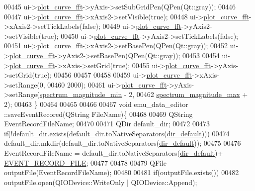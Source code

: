 \begin{DoxyCode}
00445   ui->\hyperlink{a00026_a2bdf46ca3b702151408e6f6bd96b3228}{plot\_curve\_fft}->yAxis->setSubGridPen(QPen(Qt::gray));
00446 
00447   ui->\hyperlink{a00026_a2bdf46ca3b702151408e6f6bd96b3228}{plot\_curve\_fft}->xAxis2->setVisible(\textcolor{keyword}{true});
00448   ui->\hyperlink{a00026_a2bdf46ca3b702151408e6f6bd96b3228}{plot\_curve\_fft}->xAxis2->setTickLabels(\textcolor{keyword}{false});
00449   ui->\hyperlink{a00026_a2bdf46ca3b702151408e6f6bd96b3228}{plot\_curve\_fft}->yAxis2->setVisible(\textcolor{keyword}{true});
00450   ui->\hyperlink{a00026_a2bdf46ca3b702151408e6f6bd96b3228}{plot\_curve\_fft}->yAxis2->setTickLabels(\textcolor{keyword}{false});
00451   ui->\hyperlink{a00026_a2bdf46ca3b702151408e6f6bd96b3228}{plot\_curve\_fft}->xAxis2->setBasePen(QPen(Qt::gray));
00452   ui->\hyperlink{a00026_a2bdf46ca3b702151408e6f6bd96b3228}{plot\_curve\_fft}->yAxis2->setBasePen(QPen(Qt::gray));
00453 
00454    ui->\hyperlink{a00026_a2bdf46ca3b702151408e6f6bd96b3228}{plot\_curve\_fft}->xAxis->setGrid(\textcolor{keyword}{true});
00455    ui->\hyperlink{a00026_a2bdf46ca3b702151408e6f6bd96b3228}{plot\_curve\_fft}->yAxis->setGrid(\textcolor{keyword}{true});
00456 
00457 
00458 
00459   ui->\hyperlink{a00026_a2bdf46ca3b702151408e6f6bd96b3228}{plot\_curve\_fft}->xAxis->setRange(0,
00460                                        2000);
00461   ui->\hyperlink{a00026_a2bdf46ca3b702151408e6f6bd96b3228}{plot\_curve\_fft}->yAxis->setRange(\hyperlink{a00004_afb692cc49c350d4bf120ca1e3dd61e93}{spectrum\_magnitude\_min} - 2,
00462                                       \hyperlink{a00004_ae0119c7dd2179cdcb3ea37adbefdc289}{spectrum\_magnitude\_max} + 2);
00463 \}
00464 
00465 
00466 
00467 \textcolor{keywordtype}{void} emu\_data\_editor ::saveEventRecored(QString FileName)\{
00468 
00469     QString EventRecordFileName;
00470 
00471             QDir default\_dir;
00472 
00473             \textcolor{keywordflow}{if}(!default\_dir.exists(default\_dir.toNativeSeparators(\hyperlink{a00004_aa55b7d8008e31fcc971692b493e7cf34}{dir\_default})))
00474                 default\_dir.mkdir(default\_dir.toNativeSeparators(\hyperlink{a00004_aa55b7d8008e31fcc971692b493e7cf34}{dir\_default}));
00475 
00476             EventRecordFileName = default\_dir.toNativeSeparators(\hyperlink{a00004_aa55b7d8008e31fcc971692b493e7cf34}{dir\_default})+ 
      \hyperlink{a00039_a8d4ad2cd60e024f6e0f37dbac40768a1}{EVENT\_RECORD\_FILE};
00477 
00478 
00479        QFile outputFile(EventRecordFileName);
00480 
00481        \textcolor{keywordflow}{if}(outputFile.exists())
00482        outputFile.open(QIODevice::WriteOnly | QIODevice::Append);

\end{DoxyCode}
